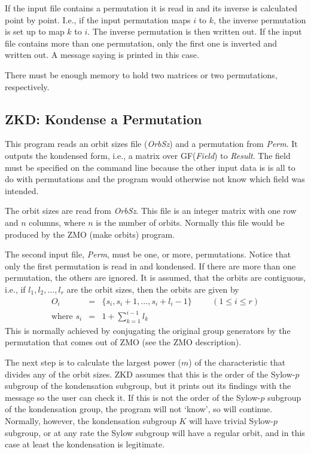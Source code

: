 If the input file contains a permutation it is read in and its
inverse is calculated point by point. I.e., if the input permutation
maps $i$ to $k$, the inverse permutation is set up to map $k$ to $i$.
The inverse permutation is then written out.
If the input file contains more than one permutation, only the first
one is inverted and written out. A message saying
is printed in this case.

\Limits
There must be enough memory to hold two matrices or two permutations,
respectively.




\subsection{ZKD: Kondense a Permutation}
\Syntax
{}

\Description
This program reads an orbit sizes file ({\it OrbSz}) and a permutation
from {\it Perm}. It outputs the kondensed form, i.e., a matrix
over GF({\it Field}) to {\it Result}. The field must be specified
on the command line because the other input data is
is all to do with permutations and the program would
otherwise not know which field was intended.

The orbit sizes are read from {\it OrbSz}. This file is an integer
matrix with one row and $n$ columns, where $n$ is the number of
orbits. Normally this file would be produced by the ZMO (make
orbits) program.

The second input file, {\it Perm}, must be one, or more, permutations.
Notice that only the first permutation is read in and kondensed. If
there are more than one permutation, the others are ignored. It is
assumed, that the orbits are contiguous, i.e., if $l_1,l_2,\ldots,l_r$
are the orbit sizes, then the orbits are given by
\begin{eqnarray*}
	O_i & = & \{s_i,s_i+1,\ldots,s_i+l_i-1\}\hspace{1cm}
		(1\leq i \leq r)\\
	\mbox{where } s_i & =& 1+\sum_{k=1}^{i-1}l_k
\end{eqnarray*}
This is normally achieved by conjugating the original group generators
by the permutation that comes out of ZMO (see the ZMO description).

The next step is to calculate the largest power ($m$) of the
characteristic that divides any of the orbit sizes. ZKD assumes that
this is the order of the Sylow-$p$ subgroup of the kondensation
subgroup, but it prints out its findings with the message
so the user can check it. If this is not the order of the Sylow-$p$
subgroup of the kondensation group, the program will not `know', so
will continue. Normally, however, the kondensation subgroup $K$ will
have trivial Sylow-$p$ subgroup, or at any rate the Sylow subgroup
will have a regular orbit, and in this case at least the kondensation
is legitimate.

